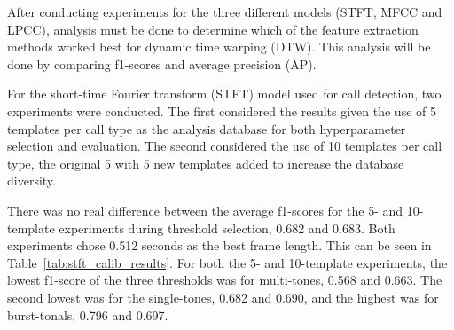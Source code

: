 \label{chap:results}

After conducting experiments for the three different models (\acs{STFT}, \acs{MFCC} and \acs{LPCC}), analysis 
must be done to determine which of the feature extraction methods worked best for dynamic time warping (\acs{DTW}). 
This analysis will be done by comparing f1-scores and average precision (\acs{AP}).

\label{sec:exp-1-stft}
For the short-time Fourier transform (\acs{STFT}) model used for call detection, two experiments were conducted. The first 
considered the results given the use of 5 templates per call type as the analysis database for both hyperparameter selection and evaluation. 
The second considered the use of 10 templates per call type, the original 5 with 5 new templates added to increase the database diversity.

\begin{table}[H]
    \caption{Calibration results for the STFT model: f1-scores and thresholds per call type, 
    average f1-score and selected frame length (in seconds) for 5 and 10 templates per call type.}
    \footnotesize
    \setlength{\tabcolsep}{3pt}
    \centering
\end{table}

There was no real difference between the average f1-scores for the 5- and 10-template experiments during threshold selection, 0.682 and 0.683. Both experiments 
chose 0.512 seconds as the best frame length.
This can be seen in Table~\ref{tab:stft_calib_results}.
For both the 5- and 10-template experiments, the lowest f1-score of the three thresholds was for multi-tones, 0.568 and 0.663. The second lowest 
was for the single-tones, 0.682 and 0.690, and the highest was for burst-tonals, 0.796 and 0.697.

